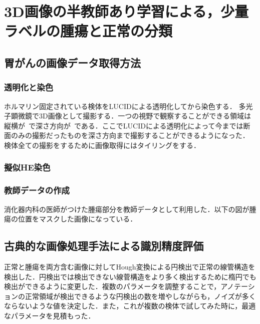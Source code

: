 \chapter{3D画像の半教師あり学習による，少量ラベルの腫瘍と正常の分類}

\section{胃がんの画像データ取得方法}

\subsection{透明化と染色}
ホルマリン固定されている検体をLUCIDによる透明化してから染色する．
多光子顕微鏡で3D画像として撮影する．一つの視野で観察することができる領域は縦横が~で深さ方向が~である．ここでLUCIDによる透明化によって今までは断面のみの撮影だったものを深さ方向まで撮影することができるようになった．
検体全ての撮影をするために画像取得にはタイリングをする．



\subsection{擬似HE染色}

\subsection{教師データの作成}
消化器内科の医師がつけた腫瘍部分を教師データとして利用した．以下の図が腫瘍の位置をマスクした画像になっている．

\begin{figure}
	\centering
\end{figure}


\section{古典的な画像処理手法による識別精度評価}
正常と腫瘍を両方含む画像に対してHough変換による円検出で正常の線管構造を検出した．円検出では検出できない線菅構造をより多く検出するために楕円でも検出ができるように変更した．複数のパラメータを調整することで，アノテーションの正常領域が検出できるような円検出の数を増やしながらも，ノイズが多くならないような値を決定した．また，これが複数の検体で試してみた時に，最適なパラメータを見積もった．

